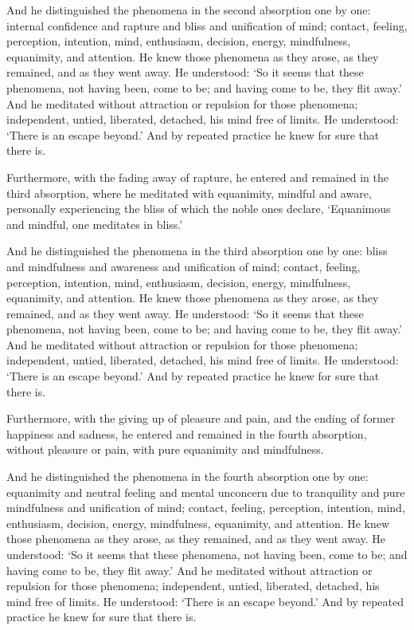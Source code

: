 \documentclass[12pt,openany]{book}%
\begin{document}
And he distinguished the phenomena in the second absorption one by one: internal confidence and rapture and bliss and unification of mind; contact, feeling, perception, intention, mind, enthusiasm, decision, energy, mindfulness, equanimity, and attention. He knew those phenomena as they arose, as they remained, and as they went away. He understood: ‘So it seems that these phenomena, not having been, come to be; and having come to be, they flit away.’ And he meditated without attraction or repulsion for those phenomena; independent, untied, liberated, detached, his mind free of limits. He understood: ‘There is an escape beyond.’ And by repeated practice he knew for sure that there is. 

Furthermore, with the fading away of rapture, he entered and remained in the third absorption, where he meditated with equanimity, mindful and aware, personally experiencing the bliss of which the noble ones declare, ‘Equanimous and mindful, one meditates in bliss.’ 

And he distinguished the phenomena in the third absorption one by one: bliss and mindfulness and awareness and unification of mind; contact, feeling, perception, intention, mind, enthusiasm, decision, energy, mindfulness, equanimity, and attention. He knew those phenomena as they arose, as they remained, and as they went away. He understood: ‘So it seems that these phenomena, not having been, come to be; and having come to be, they flit away.’ And he meditated without attraction or repulsion for those phenomena; independent, untied, liberated, detached, his mind free of limits. He understood: ‘There is an escape beyond.’ And by repeated practice he knew for sure that there is. 

Furthermore, with the giving up of pleasure and pain, and the ending of former happiness and sadness, he entered and remained in the fourth absorption, without pleasure or pain, with pure equanimity and mindfulness. 

And he distinguished the phenomena in the fourth absorption one by one: equanimity and neutral feeling and mental unconcern due to tranquility and pure mindfulness and unification of mind; contact, feeling, perception, intention, mind, enthusiasm, decision, energy, mindfulness, equanimity, and attention. He knew those phenomena as they arose, as they remained, and as they went away. He understood: ‘So it seems that these phenomena, not having been, come to be; and having come to be, they flit away.’ And he meditated without attraction or repulsion for those phenomena; independent, untied, liberated, detached, his mind free of limits. He understood: ‘There is an escape beyond.’ And by repeated practice he knew for sure that there is. 
\end{document}
